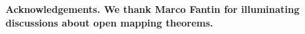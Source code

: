 \documentclass[12pt, reqno]{amsart}
\theoremstyle{plain}
\theoremstyle{definition}
\theoremstyle{remark}
\numberwithin{equation}{section}
\newcommand{\0}{\theta}
\newcommand{\1}{{-1}}
\renewcommand{\=}{\coloneqq}
\renewcommand{\.}{\dots}
\begin{document}
{\color{black}
\bf
Acknowledgements. \rm We thank Marco Fantin for illuminating discussions about open mapping theorems.

}
\end{document}
